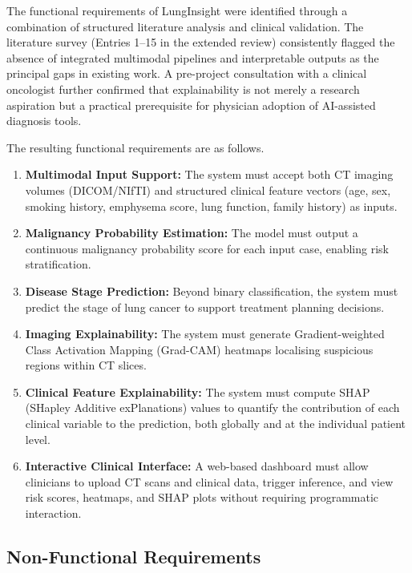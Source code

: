 {The functional requirements of LungInsight were identified through a combination of structured literature analysis and clinical validation. The literature survey (Entries 1--15 in the extended review) consistently flagged the absence of integrated multimodal pipelines and interpretable outputs as the principal gaps in existing work. A pre-project consultation with a clinical oncologist further confirmed that explainability is not merely a research aspiration but a practical prerequisite for physician adoption of AI-assisted diagnosis tools.

The resulting functional requirements are as follows.

\begin{enumerate}
    \item \textbf{Multimodal Input Support:} The system must accept both CT imaging volumes (DICOM/NIfTI) and structured clinical feature vectors (age, sex, smoking history, emphysema score, lung function, family history) as inputs.
    \item \textbf{Malignancy Probability Estimation:} The model must output a continuous malignancy probability score for each input case, enabling risk stratification.
    \item \textbf{Disease Stage Prediction:} Beyond binary classification, the system must predict the stage of lung cancer to support treatment planning decisions.
    \item \textbf{Imaging Explainability:} The system must generate Gradient-weighted Class Activation Mapping (Grad-CAM) heatmaps localising suspicious regions within CT slices.
    \item \textbf{Clinical Feature Explainability:} The system must compute SHAP (SHapley Additive exPlanations) values to quantify the contribution of each clinical variable to the prediction, both globally and at the individual patient level.
    \item \textbf{Interactive Clinical Interface:} A web-based dashboard must allow clinicians to upload CT scans and clinical data, trigger inference, and view risk scores, heatmaps, and SHAP plots without requiring programmatic interaction.
\end{enumerate}

\subsection{Non-Functional Requirements}

}
